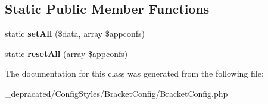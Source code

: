 \subsection*{\-Static \-Public \-Member \-Functions}
\begin{DoxyCompactItemize}
\item 
\hypertarget{class_config_styles_1_1_bracket_config_1_1_bracket_config_aa2f5106022a1089837b90c6d4fd3539d}{
static {\bfseries set\-All} (\$data, array \$appconfs)}
\label{class_config_styles_1_1_bracket_config_1_1_bracket_config_aa2f5106022a1089837b90c6d4fd3539d}

\item 
\hypertarget{class_config_styles_1_1_bracket_config_1_1_bracket_config_af8c86634a04005ad12b0bdd5ad870378}{
static {\bfseries reset\-All} (array \$appconfs)}
\label{class_config_styles_1_1_bracket_config_1_1_bracket_config_af8c86634a04005ad12b0bdd5ad870378}

\end{DoxyCompactItemize}


\-The documentation for this class was generated from the following file\-:\begin{DoxyCompactItemize}
\item 
\-\_\-depracated/\-Config\-Styles/\-Bracket\-Config/\-Bracket\-Config.\-php\end{DoxyCompactItemize}
